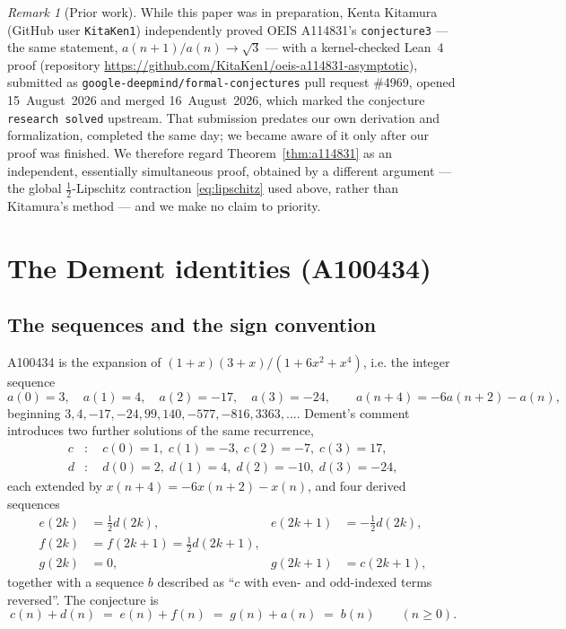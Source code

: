 \documentclass[11pt]{article}
\theoremstyle{plain}
\theoremstyle{definition}
\theoremstyle{remark}
\newtheorem*{remark}{Remark}
\numberwithin{equation}{section}
\begin{document}
\begin{remark}[Prior work]
While this paper was in preparation, Kenta Kitamura (GitHub user \texttt{KitaKen1}) independently
proved OEIS A114831's \texttt{conjecture3} --- the same statement,
$a(n+1)/a(n) \to \sqrt3$ --- with a kernel-checked Lean~4 proof
(repository \url{https://github.com/KitaKen1/oeis-a114831-asymptotic}), submitted as
\texttt{google-deepmind/formal-conjectures} pull request \#4969, opened 15~August~2026 and merged
16~August~2026, which marked the conjecture \texttt{research solved} upstream. That submission
predates our own derivation and formalization, completed the same day; we became aware of it only
after our proof was finished. We therefore regard Theorem~\ref{thm:a114831} as an independent,
essentially simultaneous proof, obtained by a different argument --- the global
$\tfrac12$-Lipschitz contraction \eqref{eq:lipschitz} used above, rather than Kitamura's method ---
and we make no claim to priority.
\end{remark}

\section{The Dement identities (A100434)}
\label{sec:a100434}

\subsection{The sequences and the sign convention}

A100434 is the expansion of $(1+x)(3+x)/(1+6x^2+x^4)$, i.e. the integer sequence
\begin{equation}
  a(0)=3,\quad a(1)=4,\quad a(2)=-17,\quad a(3)=-24,
  \qquad a(n+4) = -6a(n+2) - a(n),
  \label{eq:a100434}
\end{equation}
beginning $3, 4, -17, -24, 99, 140, -577, -816, 3363, \ldots$. Dement's comment introduces two
further solutions of the same recurrence,
\begin{align}
  c &: \quad c(0)=1,\; c(1)=-3,\; c(2)=-7,\; c(3)=17, \label{eq:cdef}\\
  d &: \quad d(0)=2,\; d(1)=4,\; d(2)=-10,\; d(3)=-24, \label{eq:ddef}
\end{align}
each extended by $x(n+4) = -6x(n+2)-x(n)$, and four derived sequences
\begin{equation}
  \begin{aligned}
    e(2k) &= \tfrac12 d(2k), & e(2k+1) &= -\tfrac12 d(2k),\\
    f(2k) &= f(2k+1) = \tfrac12 d(2k+1), & &\\
    g(2k) &= 0, & g(2k+1) &= c(2k+1),
  \end{aligned}
  \label{eq:efg}
\end{equation}
together with a sequence $b$ described as ``$c$ with even- and odd-indexed terms reversed''. The
conjecture is
\[
  c(n) + d(n) \;=\; e(n) + f(n) \;=\; g(n) + a(n) \;=\; b(n) \qquad (n \ge 0).
\]
\end{document}
